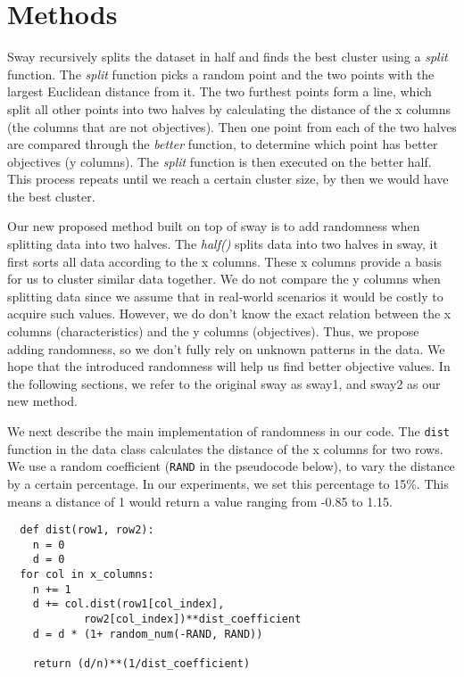 \section{Methods}
\label{sec:method}

Sway recursively splits the dataset in half and finds the best cluster
using a \textit{split} function. The \textit{split} function picks a
random point and the two points with the largest Euclidean distance from
it. The two furthest points form a line, which split all other points
into two halves by calculating the distance of the x columns (the
columns that are not objectives). Then one point from each of the two
halves are compared through the \textit{better} function, to determine
which point has better objectives (y columns). The \textit{split}
function is then executed on the better half. This process repeats until
we reach a certain cluster size, by then we would have the best cluster.


Our new proposed method built on top of sway is to add randomness when
splitting data into two halves. The \textit{half()} splits data into two
halves in sway, it first sorts all data according to the x columns.
These x columns provide a basis for us to cluster similar data together.
We do not compare the y columns when splitting data since we assume that
in real-world scenarios it would be costly to acquire such values.
However, we do don't know the
exact relation between the x columns (characteristics) and the y columns
(objectives). Thus, we propose adding randomness, so we don't fully rely
on unknown patterns in the data. We hope that the introduced randomness
will help us find better objective values. In the following sections, we
refer to the original sway as sway1, and sway2 as our new method.

We next describe the main implementation of randomness in our code. The
\verb|dist| function in the data class calculates the distance of the
x columns for two rows. We use a random coefficient (\verb|RAND| in the
pseudocode below), to vary the distance by a certain percentage. In our
experiments, we set this percentage to 15\%. This means a distance of 1
would return a value ranging from -0.85 to 1.15.

\begin{lstlisting}
  def dist(row1, row2):
    n = 0
    d = 0 
  for col in x_columns:
    n += 1
    d += col.dist(row1[col_index], 
            row2[col_index])**dist_coefficient
    d = d * (1+ random_num(-RAND, RAND))

    return (d/n)**(1/dist_coefficient)
\end{lstlisting}

